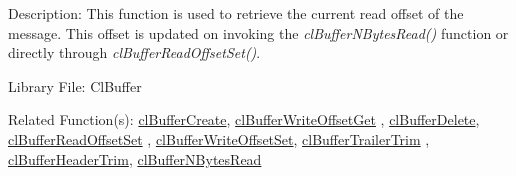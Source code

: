 \begin{Desc}
\item[Description:]This function is used to retrieve the current read offset of the message. This offset is updated on invoking the 
\textit{clBufferNBytesRead()} function or directly through 
\textit{clBufferReadOffsetSet()}.\end{Desc}
\begin{Desc}
\item[Library File:]Cl\-Buffer\end{Desc}
\begin{Desc}
\item[Related Function(s):]\hyperlink{pagebuf103}{cl\-Buffer\-Create}, \hyperlink{pagebuf118}{cl\-Buffer\-Write\-Offset\-Get} , 
\hyperlink{pagebuf105}{cl\-Buffer\-Delete}, \hyperlink{pagebuf119}{cl\-Buffer\-Read\-Offset\-Set} , 
\hyperlink{pagebuf120}{cl\-Buffer\-Write\-Offset\-Set}, \hyperlink{pagebuf125}{cl\-Buffer\-Trailer\-Trim} , 
\hyperlink{pagebuf124}{cl\-Buffer\-Header\-Trim}, \hyperlink{pagebuf108}{cl\-Buffer\-NBytes\-Read} \end{Desc}


\newpage
